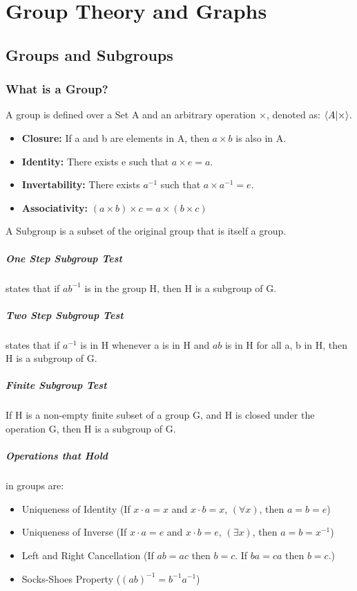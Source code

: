 \chapter{Group Theory and Graphs}



\section{Groups and Subgroups}

\subsection{What is a Group?}
A group is defined over a Set A and an arbitrary operation $\times$, denoted as: $\braket{A|\times}$.
\begin{itemize}
    \item \textbf{Closure:} If a and b are elements in A, then $a \times b$ is also in A.
    \item \textbf{Identity:} There exists e such that $a \times e = a$.
    \item \textbf{Invertability:} There exists $a^{-1}$ such that $a \times a^{-1} = e$.
    \item \textbf{Associativity:} $(a \times b) \times c = a \times (b \times c)$
\end{itemize}

A Subgroup is a subset of the original group that is itself a group.
\paragraph{One Step Subgroup Test} states that if $ab^{-1}$ is in the group H, then H is a subgroup of G.
\paragraph{Two Step Subgroup Test} states that if $a^{-1}$ is in H whenever a is in H and $ab$ is in H for all a, b in H, then H is a subgroup of G.
\paragraph{Finite Subgroup Test} If H is a non-empty finite subset of a group G, and H is closed under the operation G, then H is a subgroup of G.

\paragraph{Operations that Hold} in groups are:
\begin{itemize}
    \item Uniqueness of Identity (If $ x \cdot a = x $ and $ x \cdot b = x $, $(\forall x)$, then $a = b = e$)
    \item Uniqueness of Inverse (If $ x \cdot a = e $ and $ x \cdot b = e $, $(\exists x)$, then $a = b = x^{-1}$)
    \item Left and Right Cancellation (If $ab = ac$ then $b = c $. If $ba = ca$ then $b = c$.)
    \item Socks-Shoes Property ($(ab)^{-1} = b^{-1} a^{-1}$)
\end{itemize}


